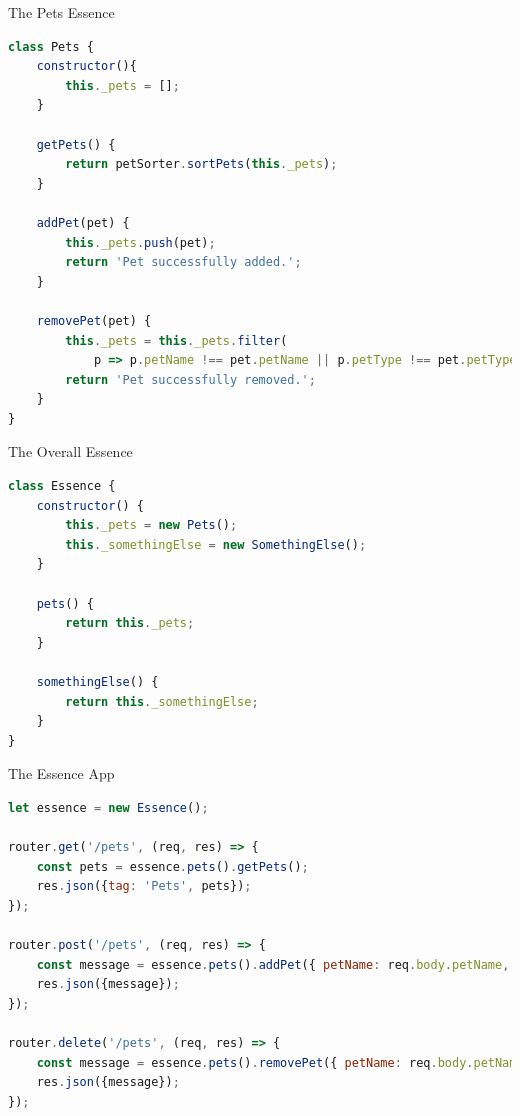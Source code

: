\begin{frame}[fragile]{The Pets Essence}

\begin{lstlisting}[language=JavaScript]
class Pets {
    constructor(){
        this._pets = [];
    }

    getPets() {
        return petSorter.sortPets(this._pets);
    }

    addPet(pet) {
        this._pets.push(pet);
        return 'Pet successfully added.';
    }

    removePet(pet) {
        this._pets = this._pets.filter(
            p => p.petName !== pet.petName || p.petType !== pet.petType);
        return 'Pet successfully removed.';
    }
}
\end{lstlisting}

\end{frame}

\begin{frame}[fragile]{The Overall Essence}

\begin{lstlisting}[language=Javascript]
class Essence {
    constructor() {
        this._pets = new Pets();
        this._somethingElse = new SomethingElse();
    }

    pets() {
        return this._pets;
    }
    
    somethingElse() {
        return this._somethingElse;
    }
}
\end{lstlisting}

\end{frame}

\begin{frame}[fragile]{The Essence App}

\begin{lstlisting}[language=Javascript]
let essence = new Essence();

router.get('/pets', (req, res) => {
    const pets = essence.pets().getPets();
    res.json({tag: 'Pets', pets});
});

router.post('/pets', (req, res) => {
    const message = essence.pets().addPet({ petName: req.body.petName, petPrice: req.body.petPrice, petType: req.body.petType });
    res.json({message});
});

router.delete('/pets', (req, res) => {
    const message = essence.pets().removePet({ petName: req.body.petName, petPrice: req.body.petPrice, petType: req.body.petType });
    res.json({message});
});
\end{lstlisting}

\end{frame}


